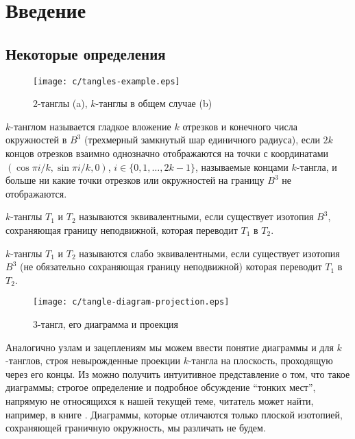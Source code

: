 \newpage
\section{Введение}

	\subsection{Некоторые определения}

	\begin{figure}[ht]
		\centering
		\texttt{[image: c/tangles-example.eps]}
		\caption{$2$-танглы (a), $k$-танглы в общем случае (b)\label{figure:tangles-example}}
	\end{figure}

	\begin{definition}
		\label{definition:tangle}
		$k$-танглом называется гладкое вложение $k$ отрезков и конечного числа окружностей в $B^3$
		(трехмерный замкнутый шар единичного радиуса), если $2k$ концов отрезков взаимно однозначно отображаются
		на точки с координатами $(\cos\pi i/k, \sin\pi i/k, 0)$, $i\in\{0, 1, \dots, 2k{-}1\}$, называемые
		концами $k$-тангла, и больше ни какие точки отрезков или окружностей на границу $B^3$ не отображаются.
	\end{definition}

	\begin{definition}
		\label{definition:tangle-equiv}
		$k$-танглы $T_1$ и $T_2$ называются эквивалентными, если существует изотопия $B^3$, сохраняющая границу
		неподвижной, которая переводит $T_1$ в $T_2$.
	\end{definition}

	\begin{definition}
		$k$-танглы $T_1$ и $T_2$ называются слабо эквивалентными, если существует изотопия $B^3$ (не обязательно
		сохраняющая границу неподвижной) которая переводит $T_1$ в $T_2$.
	\end{definition}

	\begin{figure}[ht]
		\centering
		\texttt{[image: c/tangle-diagram-projection.eps]}
		\caption{$3$-тангл, его диаграмма и проекция\label{figure:3-tangle-and-proj}}
	\end{figure}

	Аналогично узлам и зацеплениям мы можем ввести понятие диаграммы и для $k$-танглов, строя невырожденные проекции
	$k$-тангла на плоскость, проходящую через его концы. Из  
	можно получить интуитивное представление о том, что такое диаграммы; строгое определение и подробное обсуждение
	``тонких мест'', напрямую не относящихся к нашей текущей теме, читатель может найти, например, в книге \cite{Cromwell2004}.
	Диаграммы, которые отличаются только плоской изотопией, сохраняющей граничную окружность, мы различать не будем.

